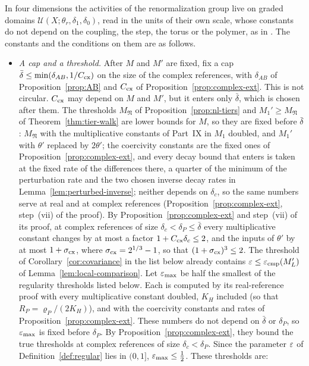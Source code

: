 \begin{remark}\label{rem:domain-constants}
In four dimensions the activities of the renormalization group live on graded domains $\mathcal U(X;\theta_r,\delta_1,\delta_0)$, read in the units of their own scale, whose constants do not depend on the coupling, the step, the torus or the polymer, as in \cite[(1.11)--(1.16)]{BalYM4I}. The constants and the conditions on them are as follows.
\begin{itemize}
\item \emph{A cap and a threshold.} After $M$ and $M'$ are fixed, fix a cap $\bar\delta\le\min(\delta_{AB},1/C_{\rm cx})$ on the size of the complex references, with $\delta_{AB}$ of Proposition~\ref{prop:AB} and $C_{\rm cx}$ of Proposition~\ref{prop:complex-ext}. This is not circular. $C_{\rm cx}$ may depend on $M$ and $M'$, but it enters only $\bar\delta$, which is chosen after them. The thresholds $M_{\mathfrak N}$ of Proposition~\ref{prop:nl-tiers} and $M_1'\ge M_{\mathfrak N}$ of Theorem~\ref{thm:tier-walk} are lower bounds for $M$, so they are fixed before $\bar\delta$: $M_{\mathfrak N}$ with the multiplicative constants of Part~IX in $M_1$ doubled, and $M_1'$ with $\theta'$ replaced by $2\theta'$; the coercivity constants are the fixed ones of Proposition~\ref{prop:complex-ext}, and every decay bound that enters is taken at the fixed rate of the differences there, a quarter of the minimum of the perturbation rate and the two chosen inverse decay rates in Lemma~\ref{lem:perturbed-inverse}; neither depends on $\delta_c$, so the same numbers serve at real and at complex references (Proposition~\ref{prop:complex-ext}, step~(vii) of the proof). By Proposition~\ref{prop:complex-ext} and step~(vii) of its proof, at complex references of size $\delta_c<\delta_P\le\bar\delta$ every multiplicative constant changes by at most a factor $1+C_{\rm cx}\delta_c\le2$, and the inputs of $\theta'$ by at most $1+\sigma_{\rm cx}$, where $\sigma_{\rm cx}=2^{1/3}-1$, so that $(1+\sigma_{\rm cx})^3\le2$. The threshold of Corollary~\ref{cor:covariance} in the list below already contains $\varepsilon\le\varepsilon_{\rm cmp}(M'_L)$ of Lemma~\ref{lem:local-comparison}. Let $\varepsilon_{\max}$ be half the smallest of the regularity thresholds listed below. Each is computed by its real-reference proof with every multiplicative constant doubled, $K_H$ included (so that $R_P=\varrho_P/(2K_H)$), and with the coercivity constants and rates of Proposition~\ref{prop:complex-ext}. These numbers do not depend on $\bar\delta$ or $\delta_P$, so $\varepsilon_{\max}$ is fixed before $\delta_P$. By Proposition~\ref{prop:complex-ext}, they bound the true thresholds at complex references of size $\delta_c<\delta_P$. Since the parameter $\varepsilon$ of Definition~\ref{def:regular} lies in $(0,1]$, $\varepsilon_{\max}\le\frac12$. These thresholds are:

\end{itemize}
\end{remark}
